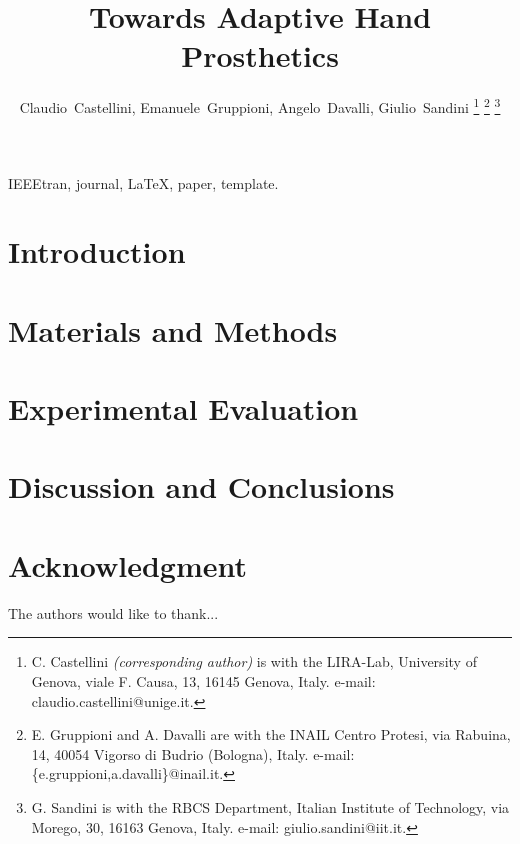 \documentclass[journal]{IEEEtran}
\begin{document}
\title{Towards Adaptive Hand Prosthetics}

\author{Claudio~Castellini, Emanuele~Gruppioni, Angelo~Davalli, Giulio~Sandini%
\thanks{C. Castellini \emph{(corresponding author)}
  is with the LIRA-Lab, University of Genova,
  viale F. Causa, 13, 16145 Genova, Italy.
  e-mail: claudio.castellini@unige.it.}%
\thanks{E. Gruppioni and A. Davalli
  are with the INAIL Centro Protesi,
  via Rabuina, 14, 40054 Vigorso di Budrio (Bologna), Italy.
  e-mail: \{e.gruppioni,a.davalli\}@inail.it.}%
\thanks{G. Sandini
  is with the RBCS Department, Italian Institute of Technology,
  via Morego, 30, 16163 Genova, Italy.
  e-mail: giulio.sandini@iit.it.}%
}

\maketitle

\begin{abstract}
  
\end{abstract}

\begin{IEEEkeywords}
  IEEEtran, journal, \LaTeX, paper, template.
\end{IEEEkeywords}

\IEEEpeerreviewmaketitle

\section{Introduction}
\label{sec:introduction}


\section{Materials and Methods}
\label{sec:m&ms}


\section{Experimental Evaluation}
\label{sec:exp}


\section{Discussion and Conclusions}
\label{sec:discussion}


\section*{Acknowledgment}

The authors would like to thank...





\end{document}
